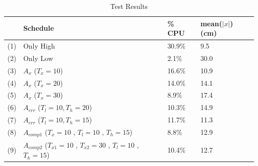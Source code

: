 \documentclass[ twoside, 12pt ]{article}
\begin{document}
\begin{table} %
    \caption{Test Results}
    \begin{center}
        \begin{tabular}{c  | m{10em} |  m{4em} | m{5em} }
            \hline
            & \textbf{Schedule}& \textbf{\% CPU}  & \textbf{mean($|x|$) (cm)} \\
            \hline
            (1)& Only High & 30.9\% & 9.5\\
            \hline
            (2)& Only Low & 2.1\% & 30.0\\
            \hline
            (3)& $A_{x}$  ($T_x=10$) & 16.6\% & 10.9\\
            \hline
            (4)& $A_{x}$  ($T_x=20$)  & 14.0\% & 14.1  \\
            \hline
            (5)& $A_{x}$  ($T_x=30$)  & 8.9\% & 17.4  \\
            \hline
            (6)& $A_{err}$ \newline ($T_l=10 , T_h=20$) & 10.3\% & 14.9 \\
            \hline
            (7)& $A_{err}$ \newline ($T_l=10 , T_h=15$) & 11.7\% & 11.3 \\
            \hline
            (8)& $A_{comp1}$ \newline ($T_x=10$ , $T_l=10$ , $T_h=15$)  & 8.8\% & 12.9 \\
            \hline
            (9)& $A_{comp2}$ \newline ($T_{x1}=10$ , $T_{x2}=30$ , $T_l=10$ , $T_h=15$)   & 10.4\% & 12.7 \\
            \hline
            
        \end{tabular}
        \label{tab:results}
    \end{center}
\end{table}
\end{document}
